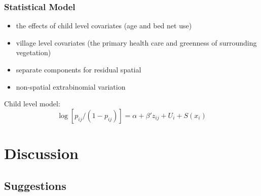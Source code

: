 \documentclass[11pt,compress,UTF8]{beamer}
\begin{document}
\begin{frame}
\frametitle{Statistical Model}
\citet{Diggle2002}
\begin{itemize}
\item the effects of child level covariates (age and bed net use)
\item village level covariates (the primary health care and greenness of surrounding vegetation)
\item separate components for residual spatial
\item non-spatial extrabinomial variation
\end{itemize}
{\color{red}Child level model:}
$$ \log [p_{ij}/(1-p_{ij})] =\alpha + \beta'z_{ij} + U_{i} + S(x_{i})$$

\end{frame}



\begin{frame}
\begin{figure}
\centering
{}
\end{figure}
\end{frame}



\section{Discussion}

\subsection{Suggestions}
\end{document}

